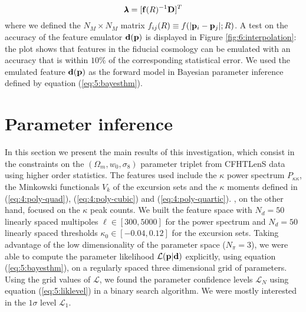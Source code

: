 \begin{equation}
\label{eq:6:weights}
\pmb{\lambda} = [\mathbf{f}(R)^{-1}\mathbf{D}]^T
\end{equation} 
%
where we defined the $N_M\times N_M$ matrix $f_{ij}(R) \equiv f(\vert\mathbf{p}_i-\mathbf{p}_j\vert;R)$. A test on the accuracy of the feature emulator $\mathbf{d}(\mathbf{p})$ is displayed in Figure \ref{fig:6:interpolation}: the plot shows that features in the fiducial cosmology can be emulated with an accuracy that is within $10\%$ of the corresponding statistical error. We used the emulated feature $\mathbf{d}(\mathbf{p})$ as the forward model in Bayesian parameter inference defined by equation (\ref{eq:5:bayesthm}). 

\section{Parameter inference}
In this section we present the main results of this investigation, which consist in the constraints on the $(\Omega_m,w_0,\sigma_8)$ parameter triplet  from CFHTLenS data using higher order statistics. The features used include the $\kappa$ power spectrum $P_{\kappa\kappa}$, the Minkowski functionals $V_k$ of the excursion sets and the $\kappa$ moments defined in (\ref{eq:4:poly-quad}), (\ref{eq:4:poly-cubic}) and (\ref{eq:4:poly-quartic}). \citep{PetriCFHTPeaks}, on the other hand, focused on the $\kappa$ peak counts. We built the feature space with $N_d=50$ linearly spaced multipoles $\ell\in[300,5000]$ for the power spectrum and $N_d=50$ linearly spaced thresholds $\kappa_0\in[-0.04,0.12]$ for the excursion sets. Taking advantage of the low dimensionality of the parameter space ($N_\pi=3$), we were able to compute the parameter likelihood $\mathcal{L}(\mathbf{p}\vert\mathbf{d})$ explicitly, using equation (\ref{eq:5:bayesthm}), on a regularly spaced three dimensional grid of parameters. Using the grid values of $\mathcal{L}$, we found the parameter confidence levels $\mathcal{L}_N$ using equation (\ref{eq:5:liklevel}) in a binary search algorithm. We were mostly interested in the $1\sigma$ level $\mathcal{L}_1$.  

